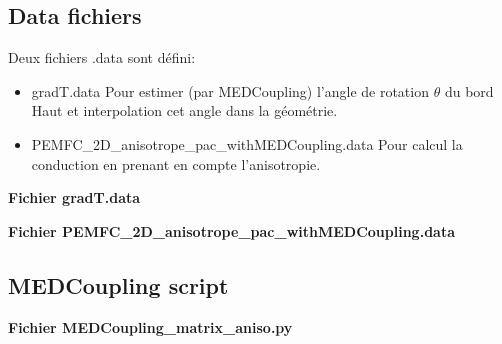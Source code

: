 \documentclass{article}
\begin{document}
	\subsection*{Data fichiers}
	Deux fichiers .data sont défini:
	\begin{itemize}
		\item gradT.data Pour estimer (par MEDCoupling) l'angle de rotation $\theta$ du bord Haut et interpolation cet angle dans la géométrie.
		\item PEMFC\_2D\_anisotrope\_pac\_withMEDCoupling.data Pour calcul la conduction en prenant en compte l'anisotropie.
	\end{itemize}


	\textbf{Fichier gradT.data}
		
		
	\textbf{Fichier PEMFC\_2D\_anisotrope\_pac\_withMEDCoupling.data}
		
		
	\subsection*{MEDCoupling script}
	\textbf{Fichier MEDCoupling\_matrix\_aniso.py}
	
\end{document}
